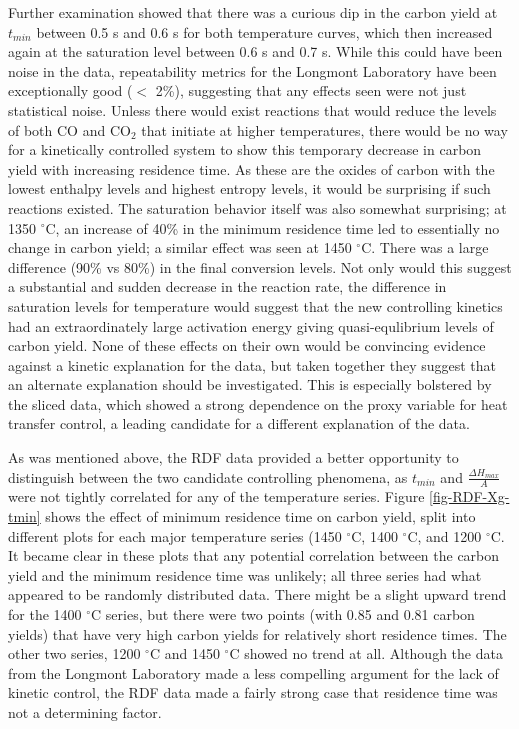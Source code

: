 \documentclass[11pt,twocolumn]{article}
\begin{document}

Further examination showed that there was a curious dip in the carbon yield at $t_{min}$ between 0.5 s and 0.6 s for both temperature curves, which then increased again at the saturation level between 0.6 s and 0.7 s.  While this could have been noise in the data, repeatability metrics for the Longmont Laboratory have been exceptionally good ($<$ 2\%), suggesting that any effects seen were not just statistical noise.  Unless there would exist reactions that would reduce the levels of both CO and CO$_{2}$ that initiate at higher temperatures, there would be no way for a kinetically controlled system to show this temporary decrease in carbon yield with increasing residence time.  As these are the oxides of carbon with the lowest enthalpy levels and highest entropy levels, it would be surprising if such reactions existed.  The saturation behavior itself was also somewhat surprising; at 1350 $^{\circ}$C, an increase of 40\% in the minimum residence time led to essentially no change in carbon yield; a similar effect was seen at 1450 $^{\circ}$C.  There was a large difference (90\% vs 80\%) in the final conversion levels.  Not only would this suggest a substantial and sudden decrease in the reaction rate, the difference in saturation levels for temperature would suggest that the new controlling kinetics had an extraordinately large activation energy giving quasi-equlibrium levels of carbon yield.  None of these effects on their own would be convincing evidence against a kinetic explanation for the data, but taken together they suggest that an alternate explanation should be investigated.  This is especially bolstered by the sliced data, which showed a strong dependence on the proxy variable for heat transfer control, a leading candidate for a different explanation of the data.

As was mentioned above, the RDF data provided a better opportunity to distinguish between the two candidate controlling phenomena, as $t_{min}$ and $\frac{\Delta H_{max}}{A}$ were not tightly correlated for any of the temperature series.  Figure \ref{fig-RDF-Xg-tmin} shows the effect of minimum residence time on carbon yield, split into different plots for each major temperature series (1450 $^{\circ}$C, 1400 $^{\circ}$C, and 1200 $^{\circ}$C.  It became clear in these plots that any potential correlation between the carbon yield and the minimum residence time was unlikely; all three series had what appeared to be randomly distributed data.  There might be a slight upward trend for the 1400 $^{\circ}$C series, but there were two points (with 0.85 and 0.81 carbon yields) that have very high carbon yields for relatively short residence times.  The other two series, 1200 $^{\circ}$C and 1450 $^{\circ}$C showed no trend at all.  Although the data from the Longmont Laboratory made a less compelling argument for the lack of kinetic control, the RDF data made a fairly strong case that residence time was not a determining factor.
\end{document}
